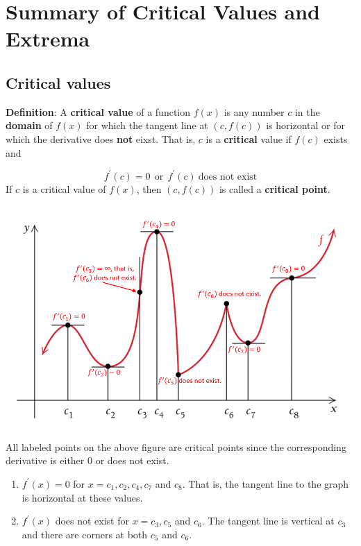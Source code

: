 \documentclass[
]{book}
\begin{document}
\hfill\break

\hypertarget{summary-of-critical-values-and-extrema}{%
\section{Summary of Critical Values and Extrema}\label{summary-of-critical-values-and-extrema}}

\hfill\break

\hypertarget{critical-values-1}{%
\subsection{Critical values}\label{critical-values-1}}

\textbf{Definition}: A \textbf{critical value} of a function \(f(x)\) is any number \(c\) in the \textbf{domain} of \(f(x)\) for which the tangent line at \((c, f(c))\) is horizontal or for which the derivative does \textbf{not} eixst. That is, \(c\) is a \textbf{critical} value if \(f(c)\) exists and

\[
f^\prime(c) = 0 ~ ~ \text{or}~~ f^\prime(c) ~ \text{does not exist}
\]
If \(c\) is a critical value of \(f(x)\), then \((c, f(c))\) is called a \textbf{critical point}.

\begin{center}\includegraphics[width=0.7\linewidth]{img08/w08-criticalValues} \end{center}

All labeled points on the above figure are critical points since the corresponding derivative is either 0 or does not exist.

\begin{enumerate}
\def\labelenumi{\arabic{enumi}.}
\item
  \(f^\prime(x) = 0\) for \(x = c_1, c_2, c_4, c_7\) and \(c_8\). That is, the tangent line to the graph is horizontal at these values.
\item
  \(f^\prime(x)\) does not exist for \(x = c_3, c_5\) and \(c_6\). The tangent line is vertical at \(c_3\) and there are corners at both \(c_5\) and \(c_6\).
\end{enumerate}
\end{document}
